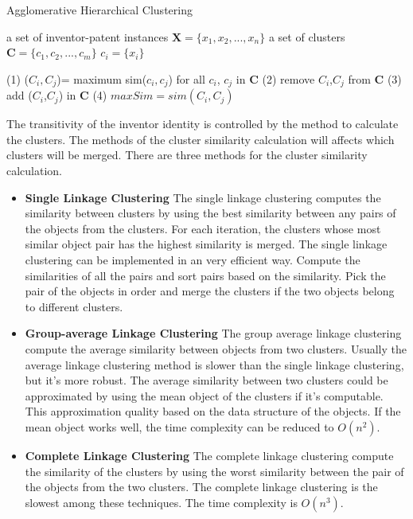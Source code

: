 \begin{algorithm}[b]
\caption{Agglomerative Hierarchical Clustering}
\begin{algorithmic}
\REQUIRE
	 a set of inventor-patent instances $\textbf{X}=\{x_1,x_2,...,x_n\}$
\ENSURE
	 a set of clusters $\textbf{C}=\{c_1,c_2,...,c_m\}$
          \STATE $c_i=\{ x_i \}$
\ENDFOR	

\REPEAT
\STATE (1) ($C_{i},C_{j}$)= maximum sim($c_i,c_j$) for all $c_i$, $c_j$ in $\textbf{C}$
\STATE (2) remove $C_{i}$,$C_{j}$ from   $\textbf{C}$
\STATE (3) add ({$C_{i}$,$C_{j}$}) in  $\textbf{C}$
\STATE (4) $maxSim=sim(C_{i},C_{j})$
  

\end{algorithmic}
\end{algorithm}


The transitivity of the inventor identity is controlled by the method to calculate the clusters. The methods of the cluster similarity calculation will affects which clusters will be merged.
There are three methods for the cluster similarity calculation. 
\begin{itemize}
\item \textbf{Single Linkage Clustering}
The single linkage clustering computes the similarity between clusters by using the best similarity between any pairs of the objects from the clusters. For each iteration, the clusters whose most similar object pair has the highest similarity is merged. The single linkage clustering can be implemented in an very efficient way. Compute the similarities of all the pairs and sort pairs based on the similarity. Pick the pair of the objects in order and merge the clusters if the   two objects belong to different clusters. 
\item \textbf{Group-average Linkage Clustering}
The group average linkage clustering compute the average similarity between objects from two clusters. Usually the average linkage clustering method is slower than the single linkage clustering, but it's more robust. The average similarity between two clusters could be approximated by using the mean object of the clusters if it's computable. This approximation quality based on the data structure of the objects. If the mean object works well, the time complexity can be reduced to $O(n^2)$.
\item \textbf{Complete Linkage Clustering}
The complete linkage clustering compute the similarity of the clusters by using the worst similarity between the pair of the objects from the two clusters. The complete linkage clustering is the slowest among these techniques. The time complexity is $O(n^3)$.
\end{itemize}

